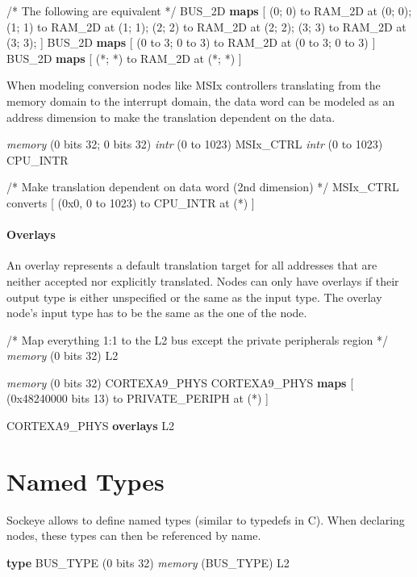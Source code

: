 \documentclass[a4paper,11pt,twoside]{report}
\begin{document}
{{{\begin{example}
  /* The following are equivalent */
  BUS_2D \textbf{maps} [
    (0; 0) to RAM_2D at (0; 0);
    (1; 1) to RAM_2D at (1; 1);
    (2; 2) to RAM_2D at (2; 2);
    (3; 3) to RAM_2D at (3; 3);
  ]
  BUS_2D \textbf{maps} [
    (0 to 3; 0 to 3) to RAM_2D at (0 to 3; 0 to 3)
  ]
  BUS_2D \textbf{maps} [
    (*; *) to RAM_2D at (*; *)
  ]
\end{example}

When modeling conversion nodes like MSIx controllers translating from the memory domain to the interrupt domain, the data word can be modeled as an address dimension to make the translation dependent on the data.

\begin{example}
  \textit{memory} (0 bits 32; 0 bits 32) \textit{intr} (0 to 1023) MSIx_CTRL
  \textit{intr} (0 to 1023) CPU_INTR

  /* Make translation dependent on data word (2nd dimension) */
  MSIx_CTRL converts [
    (0x0, 0 to 1023) to CPU_INTR at (*)
  ]

\end{example}

\paragraph{Overlays}
An overlay represents a default translation target for all addresses that are neither accepted nor explicitly translated.
Nodes can only have overlays if their output type is either unspecified or the same as the input type.
The overlay node's input type has to be the same as the one of the node.
\begin{example}
/* Map everything 1:1 to the L2 bus except the private peripherals region */
\textit{memory} (0 bits 32) L2

\textit{memory} (0 bits 32) CORTEXA9_PHYS
  CORTEXA9_PHYS \textbf{maps} [
    (0x48240000 bits 13) to PRIVATE_PERIPH at (*)
  ]

  CORTEXA9_PHYS \textbf{overlays} L2
\end{example}


\section{Named Types}
Sockeye allows to define named types (similar to typedefs in C).
When declaring nodes, these types can then be referenced by name.
\begin{example}
\textbf{type} BUS_TYPE (0 bits 32)
\textit{memory} (BUS_TYPE) L2
\end{example}

}}}
\end{document}
